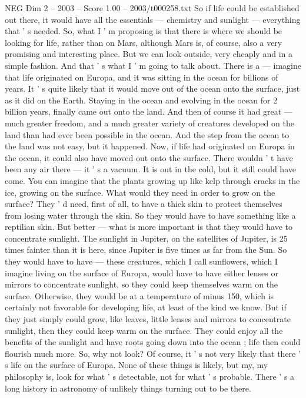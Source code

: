 \begin{textsample}{NEG Dim 2 – 2003 – Score 1.00 – 2003/t000258.txt}
So if life could be established out there, it would have all the essentials — chemistry and sunlight — everything that ' s needed.
So, what I ' m proposing is that there is where we should be looking for life, rather than on Mars, although Mars is, of course, also a very promising and interesting place.
But we can look outside, very cheaply and in a simple fashion.
And that ' s what I ' m going to talk about.
There is a — imagine that life originated on Europa, and it was sitting in the ocean for billions of years.
It ' s quite likely that it would move out of the ocean onto the surface, just as it did on the Earth.
Staying in the ocean and evolving in the ocean for 2 billion years, finally came out onto the land.
And then of course it had great — much greater freedom, and a much greater variety of creatures developed on the land than had ever been possible in the ocean.
And the step from the ocean to the land was not easy, but it happened.
Now, if life had originated on Europa in the ocean, it could also have moved out onto the surface.
There wouldn ' t have been any air there — it ' s a vacuum.
It is out in the cold, but it still could have come.
You can imagine that the plants growing up like kelp through cracks in the ice, growing on the surface.
What would they need in order to grow on the surface?
They ' d need, first of all, to have a thick skin to protect themselves from losing water through the skin.
So they would have to have something like a reptilian skin.
But better — what is more important is that they would have to concentrate sunlight.
The sunlight in Jupiter, on the satellites of Jupiter, is 25 times fainter than it is here, since Jupiter is five times as far from the Sun.
So they would have to have — these creatures, which I call sunflowers, which I imagine living on the surface of Europa, would have to have either lenses or mirrors to concentrate sunlight, so they could keep themselves warm on the surface.
Otherwise, they would be at a temperature of minus 150, which is certainly not favorable for developing life, at least of the kind we know.
But if they just simply could grow, like leaves, little lenses and mirrors to concentrate sunlight, then they could keep warm on the surface.
They could enjoy all the benefits of the sunlight and have roots going down into the ocean ; life then could flourish much more.
So, why not look?
Of course, it ' s not very likely that there ' s life on the surface of Europa.
None of these things is likely, but my, my philosophy is, look for what ' s detectable, not for what ' s probable.
There ' s a long history in astronomy of unlikely things turning out to be there.

\end{textsample}
